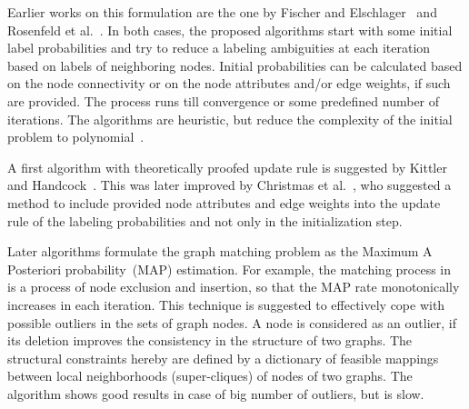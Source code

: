 Earlier works on this formulation are the one by Fischer and Elschlager~\cite{Fischler1973} and Rosenfeld et al.~\cite{Rosenfeld1976}. In both cases, the proposed algorithms start with some initial label probabilities and try to reduce a labeling ambiguities at each iteration based on labels of neighboring nodes. Initial probabilities can be calculated based on the node connectivity or on the node attributes and/or edge weights, if such are provided. The process runs till convergence or some predefined number of iterations. The algorithms are heuristic, but reduce the complexity of the initial problem to polynomial~\cite{Christmas1995}.

A first algorithm with theoretically proofed update rule is suggested by Kittler and Handcock~\cite{Hancock_Kittler}. This was later improved by Christmas et al.~\cite{Christmas1995}, who suggested a method to include provided node attributes and edge weights into the update rule of the labeling probabilities and not only in the initialization step.

Later algorithms formulate the graph matching problem as the Maximum A Posteriori probability~(MAP) estimation. For example, the matching process in~\cite{Hancock_StrucMatch} is a process of node exclusion and insertion, so that the MAP rate monotonically increases in each iteration. This technique is suggested to effectively cope with possible outliers in the sets of graph nodes. A node is considered as an outlier, if its deletion improves the consistency in the structure of two graphs. The structural constraints hereby are defined by a dictionary of feasible mappings between local neighborhoods (super-cliques) of nodes of two graphs. The algorithm shows good results in case of big number of outliers, but is slow.

